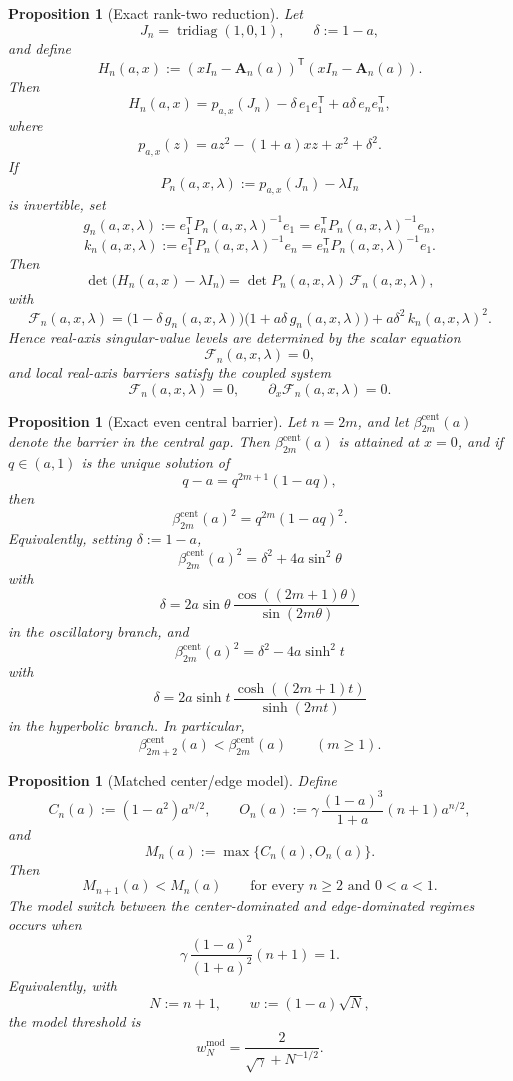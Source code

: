 \documentclass[11pt]{article}
\numberwithin{equation}{section}
\newtheorem{proposition}[theorem]{Proposition}
\begin{document}
\begin{proposition}[Exact rank-two reduction]
\label{prop:rank-two-reduction}
Let
\[
J_n=\operatorname{tridiag}(1,0,1),
\qquad
\delta:=1-a,
\]
and define
\[
H_n(a,x):=(xI_n-\mathbf A_n(a))^{\mathsf T}(xI_n-\mathbf A_n(a)).
\]
Then
\[
H_n(a,x)
=
p_{a,x}(J_n)-\delta\,e_1e_1^{\mathsf T}+a\delta\,e_ne_n^{\mathsf T},
\]
where
\[
p_{a,x}(z)=az^2-(1+a)xz+x^2+\delta^2.
\]
If
\[
P_n(a,x,\lambda):=p_{a,x}(J_n)-\lambda I_n
\]
is invertible, set
\[
g_n(a,x,\lambda):=e_1^{\mathsf T}P_n(a,x,\lambda)^{-1}e_1
=e_n^{\mathsf T}P_n(a,x,\lambda)^{-1}e_n,
\]
\[
k_n(a,x,\lambda):=e_1^{\mathsf T}P_n(a,x,\lambda)^{-1}e_n
=e_n^{\mathsf T}P_n(a,x,\lambda)^{-1}e_1.
\]
Then
\[
\det\!\bigl(H_n(a,x)-\lambda I_n\bigr)
=
\det P_n(a,x,\lambda)\,\mathcal F_n(a,x,\lambda),
\]
with
\[
\mathcal F_n(a,x,\lambda)
=
\bigl(1-\delta\,g_n(a,x,\lambda)\bigr)
\bigl(1+a\delta\,g_n(a,x,\lambda)\bigr)
+
a\delta^2\,k_n(a,x,\lambda)^2.
\]
Hence real-axis singular-value levels are determined by the scalar equation
\[
\mathcal F_n(a,x,\lambda)=0,
\]
and local real-axis barriers satisfy the coupled system
\[
\mathcal F_n(a,x,\lambda)=0,
\qquad
\partial_x\mathcal F_n(a,x,\lambda)=0.
\]
\end{proposition}

\begin{proposition}[Exact even central barrier]
\label{prop:exact-even-central}
Let \(n=2m\), and let \(\beta_{2m}^{\mathrm{cent}}(a)\) denote the barrier in the
central gap. Then \(\beta_{2m}^{\mathrm{cent}}(a)\) is attained at \(x=0\), and if
\(q\in(a,1)\) is the unique solution of
\[
q-a=q^{2m+1}(1-aq),
\]
then
\[
\beta_{2m}^{\mathrm{cent}}(a)^2=q^{2m}(1-aq)^2.
\]
Equivalently, setting \(\delta:=1-a\),
\[
\beta_{2m}^{\mathrm{cent}}(a)^2
=
\delta^2+4a\sin^2\theta
\]
with
\[
\delta
=
2a\sin\theta\,
\frac{\cos((2m+1)\theta)}{\sin(2m\theta)}
\]
in the oscillatory branch, and
\[
\beta_{2m}^{\mathrm{cent}}(a)^2
=
\delta^2-4a\sinh^2 t
\]
with
\[
\delta
=
2a\sinh t\,
\frac{\cosh((2m+1)t)}{\sinh(2m t)}
\]
in the hyperbolic branch. In particular,
\[
\beta_{2m+2}^{\mathrm{cent}}(a)<\beta_{2m}^{\mathrm{cent}}(a)
\qquad(m\ge1).
\]
\end{proposition}

\begin{proposition}[Matched center/edge model]
\label{prop:matched-model}
Define
\[
C_n(a):=(1-a^2)a^{n/2},
\qquad
O_n(a):=\gamma\,\frac{(1-a)^3}{1+a}(n+1)a^{n/2},
\]
and
\[
M_n(a):=\max\{C_n(a),O_n(a)\}.
\]
Then
\[
M_{n+1}(a)<M_n(a)
\qquad\text{for every }n\ge2\text{ and }0<a<1.
\]
The model switch between the center-dominated and edge-dominated regimes
occurs when
\[
\gamma\,\frac{(1-a)^2}{(1+a)^2}(n+1)=1.
\]
Equivalently, with
\[
N:=n+1,
\qquad
w:=(1-a)\sqrt N,
\]
the model threshold is
\[
w_N^{\mathrm{mod}}=\frac{2}{\sqrt\gamma+N^{-1/2}}.
\]
\end{proposition}
\end{document}
